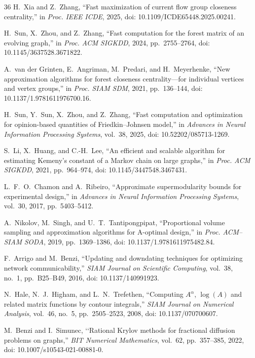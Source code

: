 \documentclass[conference]{IEEEtran}
\theoremstyle{definition}
\begin{document}
\begin{thebibliography}{36}
H.~Xia and Z.~Zhang,
``Fast maximization of current flow group closeness centrality,''
in \emph{Proc. IEEE ICDE}, 2025,
doi: 10.1109/ICDE65448.2025.00241.

H.~Sun, X.~Zhou, and Z.~Zhang,
``Fast computation for the forest matrix of an evolving graph,''
in \emph{Proc. ACM SIGKDD}, 2024, pp.~2755--2764,
doi: 10.1145/3637528.3671822.

A.~van der Grinten, E.~Angriman, M.~Predari, and H.~Meyerhenke,
``New approximation algorithms for forest closeness centrality---for individual vertices and vertex groups,''
in \emph{Proc. SIAM SDM}, 2021, pp.~136--144,
doi: 10.1137/1.9781611976700.16.

H.~Sun, Y.~Sun, X.~Zhou, and Z.~Zhang,
``Fast computation and optimization for opinion-based quantities of Friedkin--Johnsen model,''
in \emph{Advances in Neural Information Processing Systems}, vol.~38, 2025,
doi: 10.52202/085713-1269.

S.~Li, X.~Huang, and C.-H.~Lee,
``An efficient and scalable algorithm for estimating Kemeny's constant of a Markov chain on large graphs,''
in \emph{Proc. ACM SIGKDD}, 2021, pp.~964--974,
doi: 10.1145/3447548.3467431.

L.~F.~O.~Chamon and A.~Ribeiro,
``Approximate supermodularity bounds for experimental design,''
in \emph{Advances in Neural Information Processing Systems},
vol.~30, 2017, pp.~5403--5412.

A.~Nikolov, M.~Singh, and U.~T.~Tantipongpipat,
``Proportional volume sampling and approximation algorithms for
A-optimal design,'' in \emph{Proc. ACM--SIAM SODA}, 2019,
pp.~1369--1386, doi: 10.1137/1.9781611975482.84.

F.~Arrigo and M.~Benzi,
``Updating and downdating techniques for optimizing network
communicability,'' \emph{SIAM Journal on Scientific Computing},
vol.~38, no.~1, pp.~B25--B49, 2016, doi: 10.1137/140991923.

N.~Hale, N.~J.~Higham, and L.~N.~Trefethen,
``Computing $A^\alpha$, $\log(A)$ and related matrix functions by contour integrals,''
\emph{SIAM Journal on Numerical Analysis}, vol.~46, no.~5,
pp.~2505--2523, 2008, doi: 10.1137/070700607.

M.~Benzi and I.~Simunec,
\lq\lq{}Rational Krylov methods for fractional diffusion problems on graphs,''
\emph{BIT Numerical Mathematics}, vol.~62, pp.~357--385, 2022,
doi: 10.1007/s10543-021-00881-0.


\end{thebibliography}
\end{document}
